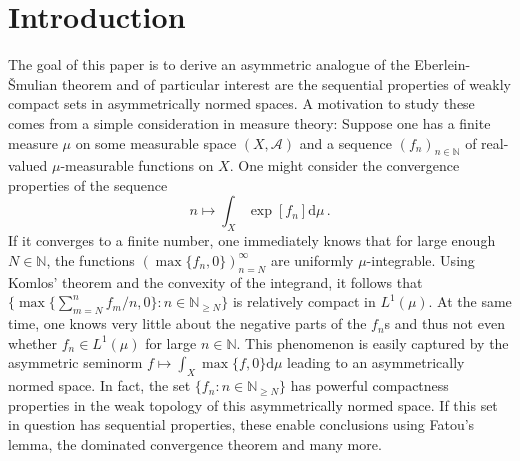 \documentclass[
	paper=A4,
	pagesize=auto,
	fontsize=12pt
]{scrartcl}
\theoremstyle{plain}
\theoremstyle{remark}
\theoremstyle{definition}
\begin{document}
\section{Introduction}
%
The goal of this paper is to derive an asymmetric analogue of the Eberlein-Šmulian theorem and of particular interest are the sequential properties of weakly compact sets in asymmetrically normed spaces.
A motivation to study these comes from a simple consideration in measure theory:
Suppose one has a finite measure $\mu$ on some measurable space $(X, \mathcal{A})$ and a sequence $(f_n)_{n \in \mathbb{N}}$ of real-valued $\mu$-measurable functions on $X$.
One might consider the convergence properties of the sequence
%
\begin{equation}
n \mapsto \int_X \exp \left[ f_n \right] \mathrm{d} \mu \, .
\end{equation}
%
If it converges to a finite number, one immediately knows that for large enough $N \in \mathbb{N}$, the functions $(\max\{ f_n, 0 \})_{n = N}^\infty$ are uniformly $\mu$-integrable.
Using Komlos' theorem and the convexity of the integrand, it follows that $\{ \max\{ \sum_{m = N}^n f_m / n, 0 \} : n \in \mathbb{N}_{\ge N} \}$ is relatively compact in $L^1(\mu)$.
At the same time, one knows very little about the negative parts of the $f_n$s and thus not even whether $f_n \in L^1(\mu)$ for large $n \in \mathbb{N}$.
This phenomenon is easily captured by the asymmetric seminorm $f \mapsto \int_X \max \{f, 0 \} \mathrm{d} \mu$ leading to an asymmetrically normed space.
In fact, the set $\{ f_n : n \in \mathbb{N}_{\ge N} \}$ has powerful compactness properties in the weak topology of this asymmetrically normed space.
If this set in question has sequential properties, these enable conclusions using Fatou's lemma, the dominated convergence theorem and many more.
\end{document}
